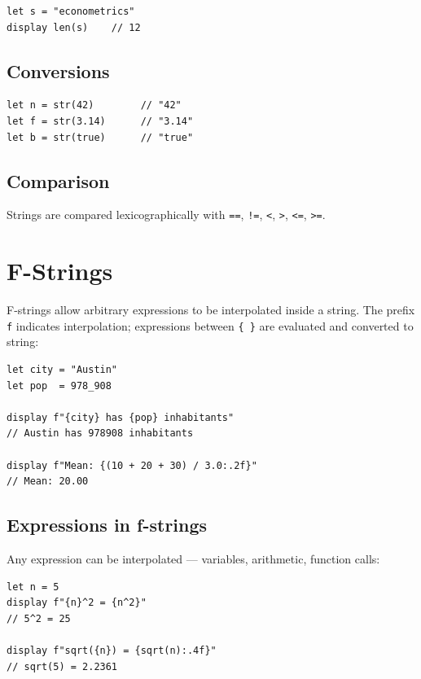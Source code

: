 \begin{lstlisting}
let s = "econometrics"
display len(s)    // 12
\end{lstlisting}

\subsection*{Conversions}

\begin{lstlisting}
let n = str(42)        // "42"
let f = str(3.14)      // "3.14"
let b = str(true)      // "true"
\end{lstlisting}

\subsection*{Comparison}

Strings are compared lexicographically with \lstinline{==}, \lstinline{!=},
\lstinline{<}, \lstinline{>}, \lstinline{<=}, \lstinline{>=}.

\section{F-Strings}

F-strings allow arbitrary expressions to be interpolated inside a string.
The prefix \lstinline{f} indicates interpolation; expressions between
\lstinline|{ }| are evaluated and converted to string:

\begin{lstlisting}[caption={F-strings}]
let city = "Austin"
let pop  = 978_908

display f"{city} has {pop} inhabitants"
// Austin has 978908 inhabitants

display f"Mean: {(10 + 20 + 30) / 3.0:.2f}"
// Mean: 20.00
\end{lstlisting}

\subsection*{Expressions in f-strings}

Any expression can be interpolated — variables, arithmetic, function calls:

\begin{lstlisting}
let n = 5
display f"{n}^2 = {n^2}"
// 5^2 = 25

display f"sqrt({n}) = {sqrt(n):.4f}"
// sqrt(5) = 2.2361
\end{lstlisting}

